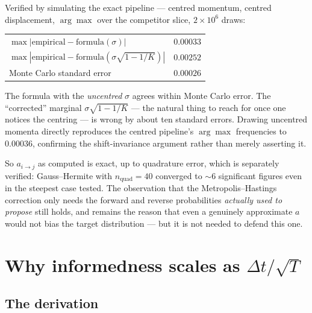 \documentclass[11pt,a4paper]{article}
\newcommand{\dt}{\Delta t}
\begin{document}
Verified by simulating the exact pipeline --- centred momentum, centred
displacement, $\arg\max$ over the competitor slice, $2\times10^{6}$ draws:
\begin{center}
\begin{tabular}{l r}
\toprule
$\max|\text{empirical} - \text{formula}(\sigma)|$ & $0.00033$ \\
$\max|\text{empirical} - \text{formula}(\sigma\sqrt{1-1/K})|$ & $0.00252$ \\
Monte Carlo standard error & $0.00026$ \\
\bottomrule
\end{tabular}
\end{center}
The formula with the \emph{uncentred} $\sigma$ agrees within Monte Carlo
error. The ``corrected'' marginal $\sigma\sqrt{1-1/K}$ --- the natural thing
to reach for once one notices the centring --- is wrong by about ten standard
errors. Drawing uncentred momenta directly reproduces the centred pipeline's
$\arg\max$ frequencies to $0.00036$, confirming the shift-invariance argument
rather than merely asserting it.

So $a_{i\to j}$ as computed is exact, up to quadrature error, which is
separately verified: Gauss--Hermite with $n_{\mathrm{quad}}=40$ converged to
$\sim\!6$ significant figures even in the steepest case tested. The
observation that the Metropolis--Hastings correction only needs the forward
and reverse probabilities \emph{actually used to propose} still holds, and
remains the reason that even a genuinely approximate $a$ would not bias the
target distribution --- but it is not needed to defend this one.

\section{\texorpdfstring{Why informedness scales as $\dt/\sqrt{T}$}{Why informedness scales as dt/sqrt(T)}}
\label{sec:scaling}

\subsection{The derivation}
\end{document}
